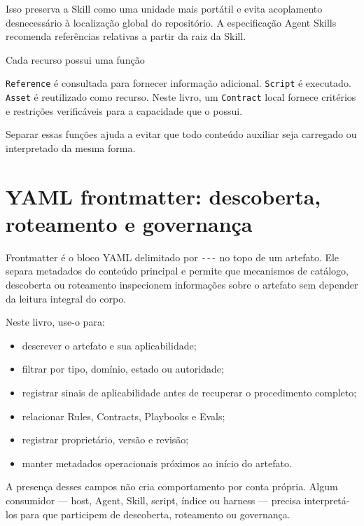 \documentclass[
  10pt,
  a4paper,
  oneside]{book}
\providecommand{\tightlist}{%
  \setlength{\itemsep}{0pt}\setlength{\parskip}{0pt}}
\begin{document}
Isso preserva a Skill como uma unidade mais portátil e evita acoplamento
desnecessário à localização global do repositório. A especificação Agent
Skills recomenda referências relativas a partir da raiz da Skill.

\begin{tipbox}{Cada recurso possui uma função}

\texttt{Reference} é consultada para fornecer informação adicional.
\texttt{Script} é executado. \texttt{Asset} é reutilizado como recurso.
Neste livro, um \texttt{Contract} local fornece critérios e restrições
verificáveis para a capacidade que o possui.

Separar essas funções ajuda a evitar que todo conteúdo auxiliar seja
carregado ou interpretado da mesma forma.

\end{tipbox}

\hypertarget{yaml-frontmatter-descoberta-roteamento-e-governanuxe7a}{%
\section{YAML frontmatter: descoberta, roteamento e
governança}\label{yaml-frontmatter-descoberta-roteamento-e-governanuxe7a}}

Frontmatter é o bloco YAML delimitado por \texttt{-\/-\/-} no topo de um
artefato. Ele separa metadados do conteúdo principal e permite que
mecanismos de catálogo, descoberta ou roteamento inspecionem informações
sobre o artefato sem depender da leitura integral do corpo.

Neste livro, use-o para:

\begin{itemize}
\tightlist
\item
  descrever o artefato e sua aplicabilidade;
\item
  filtrar por tipo, domínio, estado ou autoridade;
\item
  registrar sinais de aplicabilidade antes de recuperar o procedimento
  completo;
\item
  relacionar Rules, Contracts, Playbooks e Evals;
\item
  registrar proprietário, versão e revisão;
\item
  manter metadados operacionais próximos ao início do artefato.
\end{itemize}

A presença desses campos não cria comportamento por conta própria. Algum
consumidor --- host, Agent, Skill, script, índice ou harness --- precisa
interpretá-los para que participem de descoberta, roteamento ou
governança.
\end{document}
